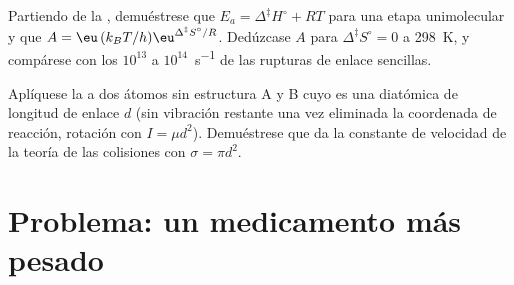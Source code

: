 \begin{exercise}[$\star\star\star$]\label{exo:b3:rate-theories:11}
Partiendo de la , demuéstrese que $E_a = \Delta^{\ddagger}H^\circ + RT$ para una
etapa unimolecular y que $A = \eu\,(k_BT/h)\eu^{\Delta^{\ddagger}S^\circ/R}$. Dedúzcase $A$ para $\Delta^{\ddagger}S^\circ = 0$ a
\qty{298}{K}, y compárese con los $10^{13}$ a $10^{14}$~\unit{s^{-1}} de las rupturas de enlace sencillas.
\end{exercise}

\begin{exercise}[$\star\star\star$]\label{exo:b3:rate-theories:12}
Aplíquese la  a dos átomos sin estructura A y B cuyo  es una diatómica de longitud de enlace $d$ (sin vibración restante una vez eliminada la coordenada
de reacción, rotación con $I = \mu d^2$). Demuéstrese que da la
constante de velocidad de la teoría de las colisiones con $\sigma = \pi d^2$.
\end{exercise}

\section{Problema: un medicamento más pesado}

